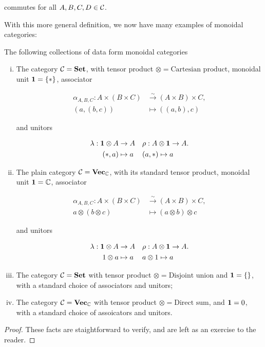 \begin{defn}
\begin{enumerate}
commutes for all $A,B,C,D\in {\mathcal C}$.
\end{enumerate}

\raggedleft\qedsymbol{}
\end{defn}

With this more general definition, we now have many examples of monoidal categories:

\begin{prop} The following collections of data form monoidal categories

\begin{enumerate}[(i)]
\item The category ${\mathcal C}={\bf Set}$, with tensor product $\otimes = \text{Cartesian product}$, monoidal unit ${\mathbf 1} =\{*\}$, associator

\begin{align*}
\alpha_{A,B,C}: A\times (B\times C) &\xrightarrow{\sim}(A\times B)\times C,\\
(a,(b,c))&\mapsto ((a,b),c)
\end{align*}

and unitors 

\begin{align*}
\lambda: {\mathbf 1} \otimes A &\to A && \rho:  A\otimes {\mathbf 1} \to A.\\
(*, a)&\mapsto a && (a,*)\mapsto a
\end{align*}

\item The plain category ${\mathcal C}={\bf Vec}_{{\mathbb C}}$, with its standard tensor product, monoidal unit ${\mathbf 1} ={\mathbb C}$, associator

\begin{align*}
\alpha_{A,B,C}: A\times (B\times C) &\xrightarrow{\sim}(A\times B)\times C,\\
a\otimes (b\otimes c ) & \mapsto (a\otimes b)\otimes c
\end{align*}

and unitors 

\begin{align*}
\lambda: {\mathbf 1} \otimes A &\to A && \rho:  A\otimes {\mathbf 1} \to A.\\
1\otimes a &\mapsto  a && a\otimes 1 \mapsto a
\end{align*}

\item The category ${\mathcal C}={\bf Set}$ with tensor product $\otimes=\text{Disjoint union}$ and ${\mathbf 1}=\{\}$, with a standard choice of associators and unitors;

\item The category ${\mathcal C}={\bf Vec}_{{\mathbb C}}$ with tensor product $\otimes = \text{Direct sum}$, and ${\mathbf 1} = 0$, with a standard choice of assoicators and unitors.
\end{enumerate}


\end{prop}
\begin{proof} These facts are staightforward to verify, and are left as an exercise to the reader.
\end{proof}

